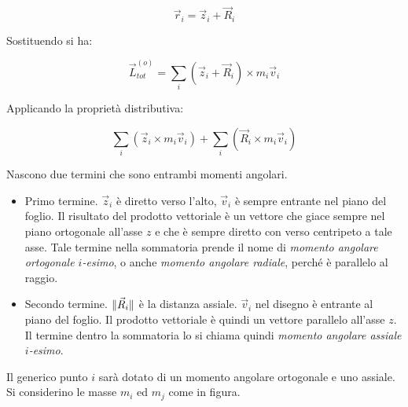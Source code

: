 \[
	\vec{r}_i = \vec{z}_i +\vec{R}_i
\]

Sostituendo si ha:

\[
	\vec{L}_{tot}^{(o)} = \sum_i \left( \vec{z}_i+\vec{R}_i\right) \times m_i\vec{v}_i
\]

Applicando la proprietà distributiva:

\[
	\sum_i \left( \vec{z}_i\times m_i\vec{v}_i    \right) + \sum_i \left( \vec{R}_i\times m_i\vec{v}_i \right)
\]

Nascono due termini che sono entrambi momenti angolari.

\begin{itemize}
	\item Primo termine. $\vec{z}_i$ è diretto verso l'alto, $\vec{v}_i$ è sempre entrante nel piano del foglio. Il risultato del prodotto vettoriale è un vettore che giace sempre nel piano ortogonale all'asse $z$ e che è sempre diretto con verso centripeto a tale asse. Tale termine nella sommatoria prende il nome di \emph{momento angolare ortogonale $i$-esimo}, o anche \emph{momento angolare radiale}, perché è parallelo al raggio.
	\item Secondo termine. $\lVert\vec{R}_i\rVert$ è la distanza assiale. $\vec{v}_i$ nel disegno è entrante al piano del foglio. Il prodotto vettoriale è quindi un vettore parallelo all'asse $z$. Il termine dentro la sommatoria lo si chiama quindi \emph{momento angolare assiale $i$-esimo}.
\end{itemize}

Il generico punto $i$ sarà dotato di un momento angolare ortogonale e uno assiale. Si considerino le masse $m_i$ ed $m_j$ come in figura.

